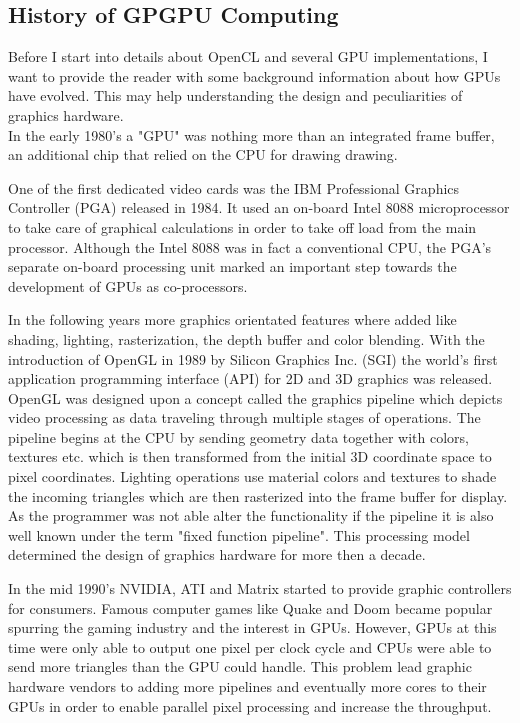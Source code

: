 \subsection{History of GPGPU Computing \cite{gpu_history}} 
\label{sec:history}
Before I start into details about OpenCL and several GPU implementations, I want to provide the reader with some background information about how GPUs have evolved. This may help understanding the design and peculiarities of graphics hardware.
\\
In the early 1980's a "GPU" was nothing more than an integrated frame buffer, an additional chip that relied on the CPU for drawing drawing.

One of the first dedicated video cards was the IBM Professional Graphics Controller (PGA) released in 1984. It used an on-board Intel 8088 microprocessor to take care of graphical calculations in order to take off load from the main processor. Although the Intel 8088 was in fact a conventional CPU, the PGA's separate on-board processing unit marked an important step towards the development of GPUs as co-processors.

In the following years more graphics orientated features where added like shading, lighting, rasterization, the depth buffer and color blending. With the introduction of OpenGL in 1989 by Silicon Graphics Inc. (SGI) the world's first application programming interface (API) for 2D and 3D graphics was released. OpenGL was designed upon a concept called the graphics pipeline which depicts video processing as data traveling through multiple stages of operations. The pipeline begins at the CPU by sending geometry data together with colors, textures etc. which is then transformed from the initial 3D coordinate space to pixel coordinates. Lighting operations use material colors and textures to shade the incoming triangles which are then rasterized into the frame buffer for display. As the programmer was not able alter the functionality if the pipeline it is also well known under the term "fixed function pipeline". This processing model determined the design of graphics hardware for more then a decade.

In the mid 1990's NVIDIA, ATI and Matrix started to provide graphic controllers for consumers. Famous computer games like Quake and Doom became popular spurring the gaming industry and the interest in GPUs. However, GPUs at this time were only able to output one pixel per clock cycle and CPUs were able to send more triangles than the GPU could handle. This problem lead graphic hardware vendors to adding more pipelines and eventually more cores to their GPUs in order to enable parallel pixel processing and increase the throughput.

